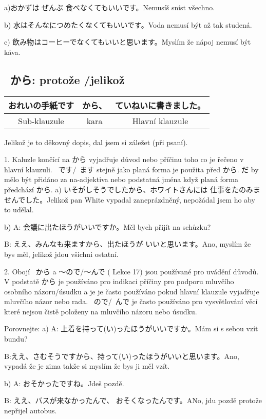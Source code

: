 a)おかずは ぜんぶ 食べなくてもいいです。Nemusíš sníst všechno.


b) 水はそんなにつめたくなくてもいいです。Voda nemusí být až tak studená.

c) 飲み物はコーヒーでなくてもいいと思います。Myslím že nápoj nemusí být káva.


\subsection{~から: protože /jelikož}
\begin{center}
\begin{tabular}{|c|c|c|}
\hline
おれいの手紙です& から、 &ていねいに書きました。\\
\hline
Sub-klauzule&kara&Hlavní klauzule\\
\hline
\end{tabular}
\end{center}
Jelikož je to děkovný dopis, dal jsem si záležet (při psaní).

1. Kaluzle končící na から vyjadřuje důvod nebo příčinu toho co je řečeno v hlavní klauzuli.
~です/~ます stejně jako planá forma je použita před から. だ by mělo být přidáno za na-adjektiva nebo podstatná jména když planá forma předchází から.
a) いそがしそうでしたから、ホワイトさんには 仕事をたのみませんでした。Jelikož pan White vypadal zaneprázdněný, nepožádal jsem ho aby to udělal.

b) A: 会議に出たほうがいいですか。Měl bych přijít na schůzku?

B: ええ、みんなも来ますから、出たほうが いいと思います。Ano, myslím že bys měl, jelikož jdou všichni ostatní.


2. Obojí ~から a 〜ので/〜んで ( Lekce 17) jsou používané pro uvádění důvodů. V podstatě から je používáno pro indikaci příčiny pro podporu mluvčího osobního názoru/úsudku a je je často používáno pokud hlavní klauzule vyjadřuje mluvčího názor nebo rada. ~ので/~んで  je často používáno pro vysvětlování věcí které nejsou čistě položeny na mluvčího názoru nebo úsudku.


Porovnejte:
a) A: 上着を持って(い)ったほうがいいですか。Mám si s sebou vzít bundu?

B:ええ、さむそうですから、持って(い)ったほうがいいと思います。Ano, vypadá že je zima takže si myslím že bys ji měl vzít.

b) A: おそかったですね。Jdeš pozdě.

B: ええ、バスが来なかったんで、 おそくなったんです。ANo, jdu pozdě protože nepřijel autobus.


